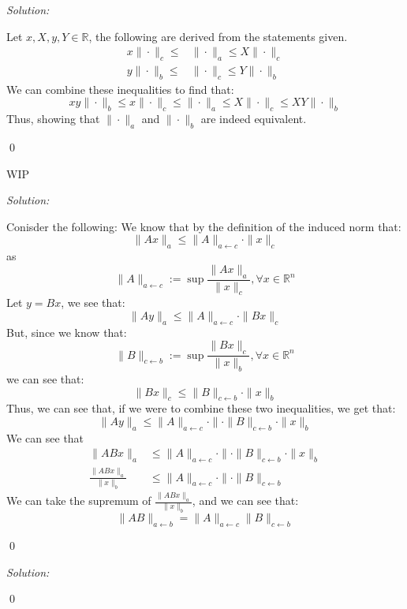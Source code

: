 \documentclass[12pt]{article}
\newenvironment{problem}[2][Problem]{\begin{trivlist}
\item[\hskip \labelsep {\bfseries #1}\hskip \labelsep {\bfseries #2.}]}{\end{trivlist}}
\newenvironment{sol}
    {\emph{Solution:}
    }
    {
    \qed
    }
\newcommand{\R}{\mathbb{R}}
\begin{document}
\newpage
\begin{problem}{2}
    
\end{problem}
\begin{sol}
    Let $x, X, y, Y \in \R$, the following are derived from the statements given.
    \begin{align*}
        x \| \cdot \|_c \leq &\| \cdot \|_a \leq X \| \cdot \|_c\\
        y \| \cdot \|_b \leq &\| \cdot \|_c \leq Y \| \cdot \|_b
    \end{align*}
    We can combine these inequalities to find that:
    \[
    xy \| \cdot \|_b \leq x \| \cdot \|_c \leq \| \cdot \|_a \leq X \| \cdot \|_c \leq  XY \|\cdot\|_b
    \]
    Thus, showing that  $\| \cdot \|_a$ and $\| \cdot \|_b$ are indeed equivalent. 
\end{sol}

\begin{problem}{3}
    WIP
\end{problem}

\begin{problem}{4}
    
\end{problem}
\begin{sol}
    Conisder the following: We know that by the definition of the induced norm that:
    \[
    \|Ax\|_a \leq \| A\|_{a \leftarrow c} \cdot \|x\|_c
    \]
    as 
    \[
    \|A\|_{a \leftarrow c} := \sup \frac{\|Ax\|_a}{\|x\|_c}, \forall x \in \R^n
    \]
    Let $y = Bx$, we see that:
    \[
    \|Ay\|_a \leq \|A\|_{a\leftarrow c} \cdot  \|Bx\|_c
    \]
    But, since we know that:
    \[
    \|B\|_{c \leftarrow b} := \sup \frac{\|Bx\|_c}{\|x\|_b}, \forall x \in \R^n
    \]
    we can see that:
    \[
        \|Bx\|_c \leq \| B\|_{c \leftarrow b} \cdot \|x\|_b
    \]
    Thus, we can see that, if we were to combine these two inequalities, we get that:
    \[
        \|Ay\|_{a} \leq \|A\|_{a\leftarrow c} \cdot \|\cdot \| B\|_{c \leftarrow b} \cdot \|x\|_b
    \]
    We can see that 
    \begin{align*}
        \|ABx\|_{a} & \leq \|A\|_{a\leftarrow c} \cdot \|\cdot \| B\|_{c \leftarrow b} \cdot \|x\|_b\\
        \frac{\|ABx\|_{a}}{\|x\|_b} & \leq \|A\|_{a\leftarrow c} \cdot \|\cdot \| B\|_{c \leftarrow b}
    \end{align*}
    We can take the supremum of $\frac{\|ABx\|_{a}}{\|x\|_b}$, and we can see that:
    \[
    \|AB\|_{a \leftarrow b} = \|A\|_{a \leftarrow c} \|B\|_{c \leftarrow b}
    \]
\end{sol}

\begin{problem}{5}
    
\end{problem}

\begin{problem}{6}
    
\end{problem}
\begin{sol}

\end{sol}
\end{document}

